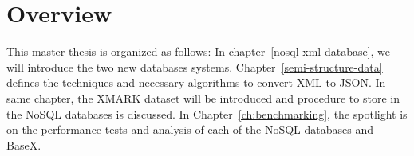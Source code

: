 		
	\section{Overview }
		This master thesis is organized as follows: In chapter~\ref{nosql-xml-database}, we will introduce the two new databases systems. Chapter~\ref{semi-structure-data} defines the techniques and necessary algorithms to convert XML  to JSON. In same chapter, the XMARK dataset will be introduced and procedure to store in the NoSQL databases is discussed. In Chapter~\ref{ch:benchmarking}, the spotlight is on the performance tests and analysis of each of the NoSQL databases and BaseX.